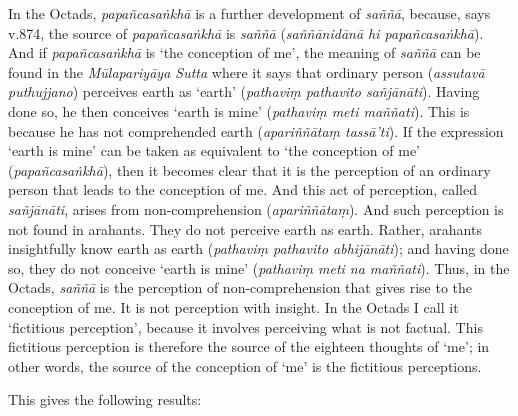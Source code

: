 In the Octads, \textit{papañcasaṅkhā} is a further development of \textit{saññā}, because, says v.874, the source of \textit{papañcasaṅkhā} is \textit{saññā} (\textit{saññānidānā hi papañcasaṅkhā}). And if \textit{papañcasaṅkhā} is `the conception of me', the meaning of \textit{saññā} can be found in the \textit{Mūlapariyāya Sutta} where it says that ordinary person (\textit{assutavā puthujjano}) perceives earth as `earth' (\textit{pathaviṃ pathavito sañjānāti}). Having done so, he then conceives `earth is mine' (\textit{pathaviṃ meti maññati}). This is because he has not comprehended earth (\textit{apariññātaṃ tassā'ti}). If the expression `earth is mine' can be taken as equivalent to `the conception of me' (\textit{papañcasaṅkhā}), then it becomes clear that it is the perception of an ordinary person that leads to the conception of me. And this act of perception, called \textit{sañjānāti}, arises from non-comprehension (\textit{apariññātaṃ}). And such perception is not found in arahants. They do not perceive earth as earth. Rather, arahants insightfully know earth as earth (\textit{pathaviṃ pathavito abhijānāti}); and having done so, they do not conceive `earth is mine' (\textit{pathaviṃ meti na maññati}). Thus, in the Octads, \textit{saññā} is the perception of non-comprehension that gives rise to the conception of me. It is not perception with insight. In the Octads I call it `fictitious perception', because it involves perceiving what is not factual. This fictitious perception is therefore the source of the eighteen thoughts of `me'; in other words, the source of the conception of `me' is the fictitious perceptions.

This gives the following results:

